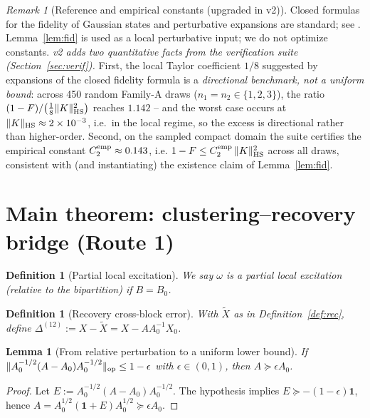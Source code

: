 \documentclass[11pt]{article}
\newtheorem{lemma}[theorem]{Lemma}
\newtheorem{definition}[theorem]{Definition}
\theoremstyle{remark}
\newtheorem{remark}[theorem]{Remark}
\newcommand{\HS}{{\rm HS}}
\newcommand{\op}{{\rm op}}
\begin{document}
\begin{remark}[Reference and empirical constants (upgraded in v2)]
\label{rem:constants}
Closed formulas for the fidelity of Gaussian states and perturbative
expansions are standard; see \cite{BBP, Weedbrook, Serafini}.
Lemma~\ref{lem:fid} is used as a local perturbative input; we do not
optimize constants. \emph{v2 adds two quantitative facts from the
verification suite (Section~\ref{sec:verif}).} First, the local Taylor
coefficient $1/8$ suggested by expansions of the closed fidelity formula is
a \emph{directional benchmark, not a uniform bound}: across 450 random
Family-A draws ($n_1 = n_2 \in \{1,2,3\}$), the ratio
$(1-F)/\bigl(\tfrac18\|K\|_\HS^2\bigr)$ reaches $1.142$ -- and the worst
case occurs at $\|K\|_\HS \approx 2\times 10^{-3}$, i.e.\ in the local
regime, so the excess is directional rather than higher-order. Second, on
the sampled compact domain the suite certifies the empirical constant
$C_2^{\rm emp} \approx 0.143$, i.e.
$1 - F \le C_2^{\rm emp}\, \|K\|_\HS^2$ across all draws, consistent with
(and instantiating) the existence claim of Lemma~\ref{lem:fid}.
\end{remark}

\section{Main theorem: clustering--recovery bridge (Route 1)}
\begin{definition}[Partial local excitation]
\label{def:ple}
We say $\omega$ is a partial local excitation (relative to the bipartition)
if $B = B_0$.
\end{definition}

\begin{definition}[Recovery cross-block error]
\label{def:d12}
With $\tilde X$ as in Definition~\ref{def:rec}, define
$\Delta^{(12)} := X - \tilde X = X - A A_0^{-1} X_0$.
\end{definition}

\begin{lemma}[From relative perturbation to a uniform lower bound]
\label{lem:eps}
If $\|A_0^{-1/2}(A - A_0)A_0^{-1/2}\|_\op \le 1 - \epsilon$ with
$\epsilon \in (0,1)$, then $A \succeq \epsilon A_0$.
\end{lemma}
\begin{proof}
Let $E := A_0^{-1/2}(A - A_0)A_0^{-1/2}$. The hypothesis implies
$E \succeq -(1-\epsilon)\mathbf{1}$, hence
$A = A_0^{1/2}(\mathbf{1} + E)A_0^{1/2} \succeq \epsilon A_0$.
\end{proof}
\end{document}
